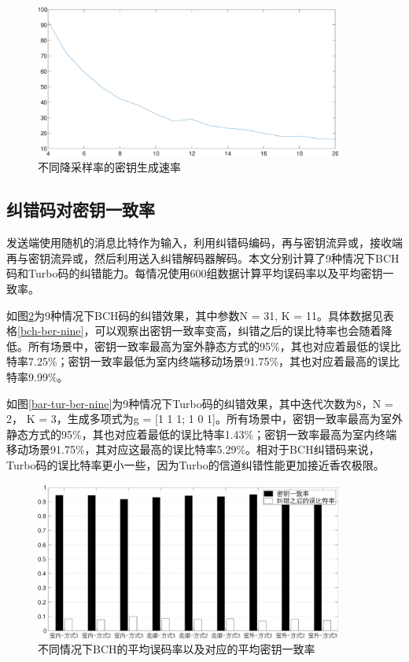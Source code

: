 \documentclass[master]{seuthesis} %
\begin{document}
\begin{Main}
\begin{figure}[htbp!]
    \centering \includegraphics[width=0.9\textwidth]{images/keyrate.eps}
    \caption{不同降采样率的密钥生成速率}
    \label{keyrate}
\end{figure}


\subsection{纠错码对密钥一致率}

发送端使用随机的消息比特作为输入，利用纠错码编码，再与密钥流异或，接收端再与密钥流异或，然后利用送入纠错解码器解码。本文分别计算了9种情况下BCH码和Turbo码的纠错能力。每情况使用600组数据计算平均误码率以及平均密钥一致率。

如图\ref{bar-bch-ber-nine}为9种情况下BCH码的纠错效果，其中参数N = 31, K = 11。具体数据见表格\ref{bch-ber-nine}，可以观察出密钥一致率变高，纠错之后的误比特率也会随着降低。所有场景中，密钥一致率最高为室外静态方式的95\%，其也对应着最低的误比特率7.25\%；密钥一致率最低为室内终端移动场景91.75\%，其也对应着最高的误比特率9.99\%。

如图\ref{bar-tur-ber-nine}为9种情况下Turbo码的纠错效果，其中迭代次数为8，N = 2， K = 3，生成多项式为g = [1 1 1; 1 0 1]。所有场景中，密钥一致率最高为室外静态方式的95\%，其也对应着最低的误比特率1.43\%；密钥一致率最高为室内终端移动场景91.75\%，其对应这最高的误比特率5.29\%。相对于BCH纠错码来说，Turbo码的误比特率更小一些，因为Turbo的信道纠错性能更加接近香农极限。

\begin{figure}[htbp!]
    \centering \includegraphics[width=0.9\textwidth]{images/tdd-encode/bch-ber-nine.eps}
    \caption{不同情况下BCH的平均误码率以及对应的平均密钥一致率}
    \label{bar-bch-ber-nine}
\end{figure}


\end{Main}
\end{document}
